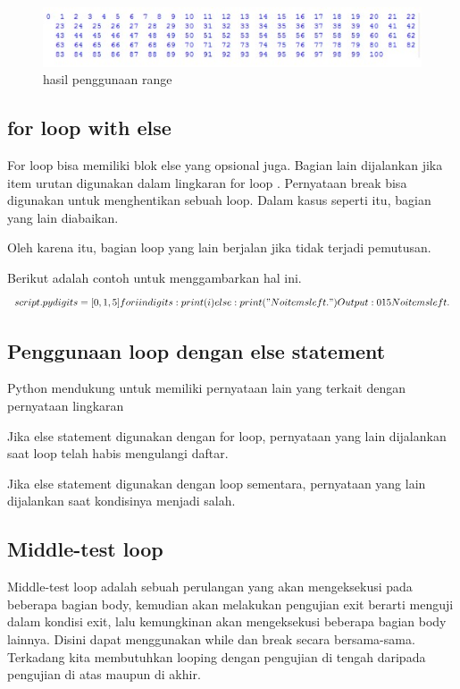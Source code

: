 \begin{figure}[ht]
    \centerline{\includegraphics[width=1\textwidth]{figures/2_range3.JPG}}
    \caption{hasil penggunaan range}
    \label{2_range3}
    \end{figure}

\subsection{for loop with else}
For loop bisa memiliki blok else yang opsional juga. Bagian lain dijalankan jika item urutan digunakan dalam lingkaran for loop .
Pernyataan break bisa digunakan untuk menghentikan sebuah loop. Dalam kasus seperti itu, bagian yang lain diabaikan.

Oleh karena itu, bagian loop yang lain berjalan jika tidak terjadi pemutusan.

Berikut adalah contoh untuk menggambarkan hal ini.
\begin{equation}
script.py 
digits = [0, 1, 5]

for i in digits:
    print(i)
else:
    print("No items left.")
Output :
0
1
5
No items left.
\end{equation}

\subsection{Penggunaan loop dengan else statement}
Python mendukung untuk memiliki pernyataan lain yang terkait dengan pernyataan lingkaran

Jika else statement digunakan dengan for loop, pernyataan yang lain dijalankan saat loop telah habis mengulangi daftar.

Jika else statement digunakan dengan loop sementara, pernyataan yang lain dijalankan saat kondisinya menjadi salah.

\subsection{Middle-test loop}
Middle-test loop adalah sebuah perulangan yang akan mengeksekusi pada beberapa bagian body, kemudian akan melakukan pengujian exit berarti menguji dalam kondisi exit, lalu kemungkinan akan mengeksekusi beberapa bagian body lainnya. Disini dapat menggunakan while dan break secara bersama-sama. Terkadang kita membutuhkan looping dengan pengujian di tengah daripada pengujian di atas maupun di akhir.

